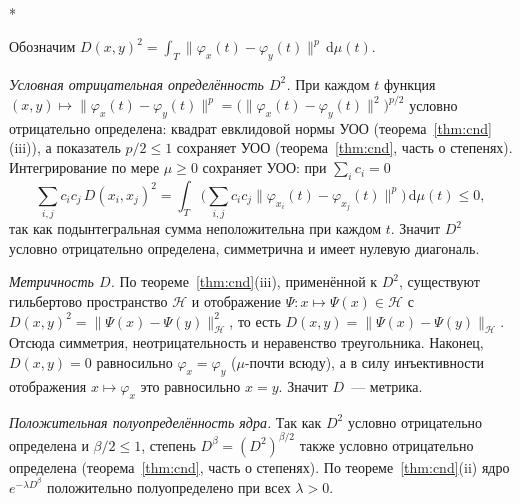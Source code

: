 \documentclass[14pt, a4paper]{extarticle}
\makeatletter
\theoremstyle{definition}
\theoremstyle{plain}
\renewenvironment{proof}[1][\proofname]{\par
    \pushQED{\qed}%
    \normalfont \topsep6\p@\@plus6\p@\relax
    \trivlist
    \item[\hskip\labelsep\itshape #1\@addpunct{.}]\mbox{}\\*
    \ignorespaces
}{\popQED\endtrivlist\@endpefalse}
\makeatother
\begin{document}
\begin{proof}[Доказательство теоремы~\ref{thm:lp}]
Обозначим $D(x,y)^2=\int_T\|\varphi_x(t)-\varphi_y(t)\|^{p}\,\mathrm{d}\mu(t)$.

\emph{Условная отрицательная определённость $D^2$.} При каждом $t$ функция
$(x,y)\mapsto\|\varphi_x(t)-\varphi_y(t)\|^{p}
=\big(\|\varphi_x(t)-\varphi_y(t)\|^{2}\big)^{p/2}$ условно отрицательно
определена: квадрат евклидовой нормы УОО (теорема~\ref{thm:cnd}(iii)), а показатель
$p/2\le1$ сохраняет УОО (теорема~\ref{thm:cnd}, часть о степенях). Интегрирование по
мере $\mu\ge0$ сохраняет УОО: при $\sum_i c_i=0$
\[
    \sum_{i,j} c_i c_j\,D(x_i,x_j)^2
    =\int_T\Big(\sum_{i,j}c_ic_j\|\varphi_{x_i}(t)-\varphi_{x_j}(t)\|^{p}\Big)\,\mathrm{d}\mu(t)\le0,
\]
так как подынтегральная сумма неположительна при каждом $t$. Значит $D^2$ условно
отрицательно определена, симметрична и имеет нулевую диагональ.

\emph{Метричность $D$.} По теореме~\ref{thm:cnd}(iii), применённой к $D^2$,
существуют гильбертово пространство $\mathcal{H}$ и отображение
$\Psi:x\mapsto\Psi(x)\in\mathcal{H}$ с
$D(x,y)^2=\|\Psi(x)-\Psi(y)\|_{\mathcal{H}}^2$, то есть
$D(x,y)=\|\Psi(x)-\Psi(y)\|_{\mathcal{H}}$. Отсюда симметрия, неотрицательность и
неравенство треугольника. Наконец, $D(x,y)=0$ равносильно $\varphi_x=\varphi_y$
($\mu$-почти всюду), а в силу инъективности отображения $x\mapsto\varphi_x$ это
равносильно $x=y$. Значит $D$~--- метрика.

\emph{Положительная полуопределённость ядра.} Так как $D^2$ условно отрицательно
определена и $\beta/2\le1$, степень $D^{\beta}=(D^2)^{\beta/2}$ также условно
отрицательно определена (теорема~\ref{thm:cnd}, часть о степенях). По
теореме~\ref{thm:cnd}(ii) ядро $e^{-\lambda D^{\beta}}$ положительно полуопределено
при всех $\lambda>0$.
\end{proof}
\end{document}
